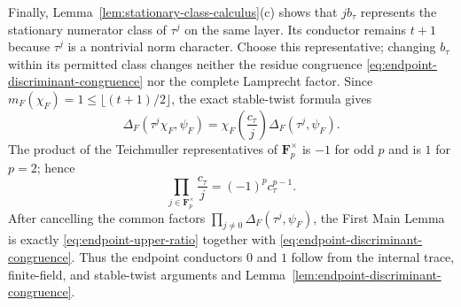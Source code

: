 \documentclass[11pt]{amsart}
\theoremstyle{definition}
\theoremstyle{remark}
\newcommand{\F}{\mathbf F}
\begin{document}
Finally, Lemma~\ref{lem:stationary-class-calculus}(c) shows that
$jb_\tau$ represents the stationary numerator class of $\tau^j$ on the
same layer.  Its conductor remains $t+1$ because $\tau^j$ is a
nontrivial norm character.  Choose this representative; changing
$b_\tau$ within its permitted class changes neither the residue
congruence \eqref{eq:endpoint-discriminant-congruence} nor the complete
Lamprecht factor.  Since
$m_F(\chi_F)=1\le\lfloor(t+1)/2\rfloor$, the exact stable-twist formula
gives
\[
 \Delta_F(\tau^j\chi_F,\psi_F)
 =\chi_F\!\left(\frac{c_\tau}{j}\right)
  \Delta_F(\tau^j,\psi_F).
\]
The product of the Teichmuller representatives of
$\F_p^\times$ is $-1$ for odd $p$ and is $1$ for $p=2$; hence
\[
 \prod_{j\in\F_p^\times}\frac{c_\tau}{j}
 =(-1)^p c_\tau^{p-1}.
\]
After cancelling the common factors
$\prod_{j\ne0}\Delta_F(\tau^j,\psi_F)$, the First Main Lemma is
exactly \eqref{eq:endpoint-upper-ratio} together with
\eqref{eq:endpoint-discriminant-congruence}.  Thus the endpoint
conductors $0$ and $1$ follow from the internal trace, finite-field, and
stable-twist arguments and Lemma~\ref{lem:endpoint-discriminant-congruence}.
\end{document}
